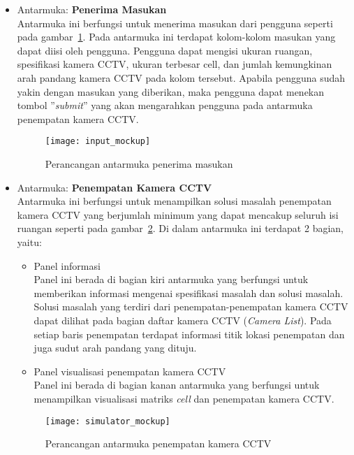 \begin{itemize}
	\item Antarmuka: \textbf{Penerima Masukan}\\
	Antarmuka ini berfungsi untuk menerima masukan dari pengguna seperti pada gambar~\ref{fig:input_mockup}. Pada antarmuka ini terdapat kolom-kolom masukan yang dapat diisi oleh pengguna. Pengguna dapat mengisi ukuran ruangan, spesifikasi kamera CCTV, ukuran terbesar cell, dan jumlah kemungkinan arah pandang kamera CCTV pada kolom tersebut. Apabila pengguna sudah yakin dengan masukan yang diberikan, maka pengguna dapat menekan tombol ''\textit{submit}'' yang akan mengarahkan pengguna pada antarmuka penempatan kamera CCTV.

	\begin{figure}[h]
		\centering  
		\texttt{[image: input\_mockup]}
		\caption[Perancangan antarmuka penerima masukan]{Perancangan antarmuka penerima masukan}
		\label{fig:input_mockup}
	\end{figure}

	\item Antarmuka: \textbf{Penempatan Kamera CCTV}\\
	Antarmuka ini berfungsi untuk menampilkan solusi masalah penempatan kamera CCTV yang berjumlah minimum yang dapat mencakup seluruh isi ruangan seperti pada gambar~\ref{fig:simulator_mockup}. Di dalam antarmuka ini terdapat 2 bagian, yaitu:
	\begin{itemize}
		\item Panel informasi\\
		Panel ini berada di bagian kiri antarmuka yang berfungsi untuk memberikan informasi mengenai spesifikasi masalah dan solusi masalah. Solusi masalah yang terdiri dari penempatan-penempatan kamera CCTV dapat dilihat pada bagian daftar kamera CCTV (\textit{Camera List}). Pada setiap baris penempatan terdapat informasi titik lokasi penempatan dan juga sudut arah pandang yang dituju.
		
		\item Panel visualisasi penempatan kamera CCTV\\
		Panel ini berada di bagian kanan antarmuka yang berfungsi untuk menampilkan visualisasi matriks \textit{cell} dan penempatan kamera CCTV.
	\end{itemize}
	\begin{figure}[h]
		\centering  
		\texttt{[image: simulator\_mockup]}
		\caption[Perancangan antarmuka penempatan kamera CCTV]{Perancangan antarmuka penempatan kamera CCTV}
		\label{fig:simulator_mockup}
	\end{figure}
\end{itemize}

